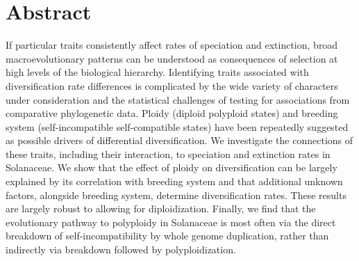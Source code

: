 \section{Abstract}

If particular traits consistently affect rates of speciation and extinction, broad macroevolutionary patterns can be understood as consequences of selection at high levels of the biological hierarchy.
Identifying traits associated with diversification rate differences is complicated by the wide variety of characters under consideration and the statistical challenges of testing for associations from comparative phylogenetic data.
Ploidy (diploid \vs polyploid states) and breeding system (self-incompatible \vs self-compatible states) have been repeatedly suggested as possible drivers of differential diversification.
We investigate the connections of these traits, including their interaction, to speciation and extinction rates in Solanaceae.
We show that the effect of ploidy on diversification can be largely explained by its correlation with breeding system and that additional unknown factors, alongside breeding system, determine diversification rates.
These results are largely robust to allowing for diploidization.
Finally, we find that the evolutionary pathway to polyploidy in Solanaceae is most often via the direct breakdown of self-incompatibility by whole genome duplication, rather than indirectly via breakdown followed by polyploidization.
